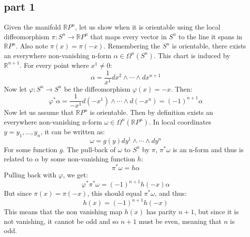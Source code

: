 \documentclass{article}
\newcommand{\R}{\ensuremath{\mathbb{R}}}
\begin{document}
\subsection*{part 1}
Given the manifold $\R P^n$, let us show when it is orientable using the local diffeomorphism $\pi: S^n \rightarrow \R P^n$ that maps every vector in $S^n$ to the line it spans in $\R P^n$. Also note $\pi(x) = \pi(-x)$.
Remembering the $S^n$ is orientable, there exists an everywhere non-vanishing n-form $\alpha \in \Omega^n(S^n)$. This chart is induced by $\R^{n+1}$. For every point where $x^1 \ne 0$:
\begin{equation}
    \alpha = \frac{1}{x^1} dx^2 \wedge \cdots \wedge dx^{n+1}
\end{equation}
Now let $\varphi: S^n \rightarrow S^n$ be the diffeomorphism $\varphi(x) = -x$. Then:
\begin{equation}
    \varphi^* \alpha = \frac{1}{-x^1} d(-x^1) \wedge \cdots \wedge d(-x^n) = (-1)^{n+1} \alpha
\end{equation}
Now let us assume that $\R P^n$ is orientable. Then by definition exists an everywhere non-vanishing n-form $\omega \in \Omega^n(\R P^n)$. In local coordinates $y = y_1, \dots, y_n$, it can be written as:
\begin{equation}
    \omega = g(y)dy^1 \wedge \cdots \wedge dy^n
\end{equation}
For some function $g$. The pull-back of $\omega$ to $S^n$ by $\pi$, $\pi^* \omega$ is an n-form and thus is related to $\alpha$ by some non-vanishing function $h$:
\begin{equation}
    \pi^*\omega = h\alpha
\end{equation}
Pulling back with $\varphi$, we get:
\begin{equation}
    \varphi^*\pi^*\omega = (-1)^{n+1} h(-x)\alpha
\end{equation}
But since $\pi(x) = \pi(-x)$, this should equal $\pi^*\omega$, and thus:
\begin{equation}
    h(x) = (-1)^{n+1} h(-x)
\end{equation}
This means that the non vanishing map $h(x)$ has parity $n+1$, but since it is not vanishing, it cannot be odd and so $n+1$ must be even, meaning that $n$ is odd.
\end{document}
